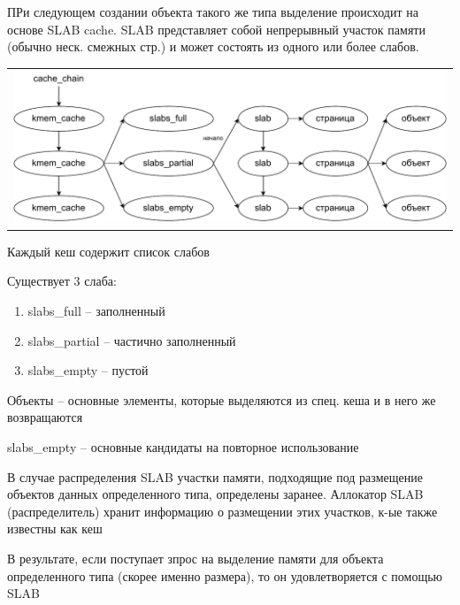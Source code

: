 ПРи следующем создании объекта такого же типа выделение происходит на основе SLAB cache. SLAB представляет собой непрерывный участок памяти (обычно неск. смежных стр.) и может состоять из одного или более слабов.

\begin{table}[h!]
	\centering
	\begin{tabular}{p{1\linewidth}}
		\centering
		\includegraphics[width=0.8\linewidth]{./images/slabs.pdf}
	\end{tabular}
\end{table}

Каждый кеш содержит список слабов

Существует 3 слаба:
\begin{enumerate}
	\item slabs\_full -- заполненный
	\item slabs\_partial -- частично заполненный
	\item slabs\_empty -- пустой
\end{enumerate}

Объекты -- основные элементы, которые выделяются из спец. кеша и в него же возвращаются

slabs\_empty -- основные кандидаты на повторное использование

В случае распределения SLAB участки памяти, подходящие под размещение объектов данных определенного типа, определены заранее. Аллокатор SLAB (распределитель) хранит информацию о размещении этих участков, к-ые также известны как кеш

В результате, если поступает зпрос на выделение памяти для объекта определенного типа (скорее именно размера), то он удовлетворяется с помощью SLAB

